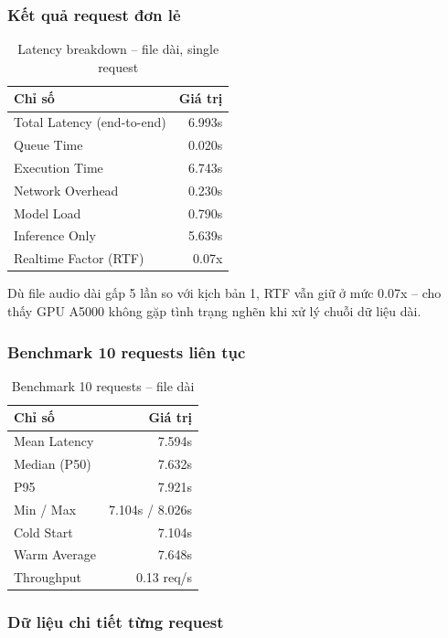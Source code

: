 \documentclass[12pt,a4paper]{article}
\begin{document}
\subsubsection{Kết quả request đơn lẻ}

\begin{table}[H]
\centering
\begin{tabular}{lr}
\toprule
\textbf{Chỉ số} & \textbf{Giá trị} \\
\midrule
Total Latency (end-to-end) & 6.993s \\
Queue Time & 0.020s \\
Execution Time & 6.743s \\
Network Overhead & 0.230s \\
\midrule
Model Load & 0.790s \\
Inference Only & 5.639s \\
Realtime Factor (RTF) & 0.07x \\
\bottomrule
\end{tabular}
\caption{Latency breakdown -- file dài, single request}
\end{table}

Dù file audio dài gấp 5 lần so với kịch bản 1, RTF vẫn giữ ở mức 0.07x -- cho thấy GPU A5000 không gặp tình trạng nghẽn khi xử lý chuỗi dữ liệu dài.

\subsubsection{Benchmark 10 requests liên tục}

\begin{table}[H]
\centering
\begin{tabular}{lr}
\toprule
\textbf{Chỉ số} & \textbf{Giá trị} \\
\midrule
Mean Latency & 7.594s \\
Median (P50) & 7.632s \\
P95 & 7.921s \\
Min / Max & 7.104s / 8.026s \\
\midrule
Cold Start & 7.104s \\
Warm Average & 7.648s \\
Throughput & 0.13 req/s \\
\bottomrule
\end{tabular}
\caption{Benchmark 10 requests -- file dài}
\end{table}

\subsubsection{Dữ liệu chi tiết từng request}
\end{document}
